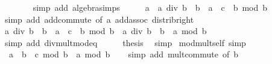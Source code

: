 \begin{isabellebody}
\ \ \ \ \ \ \isamarkupfalse%
\ {\isacharparenleft}{\kern0pt}simp\ add{\isacharcolon}{\kern0pt}\ algebra{\isacharunderscore}{\kern0pt}simps{\isacharparenright}{\kern0pt}\isanewline
\ \ \isamarkupfalse%
\ \isamarkupfalse%
\ {\isachardoublequoteopen}a\ {\isacharequal}{\kern0pt}\ a\ div\ b\ {\isacharasterisk}{\kern0pt}\ b\ {\isacharplus}{\kern0pt}\ {\isacharparenleft}{\kern0pt}a\ {\isacharplus}{\kern0pt}\ c\ {\isacharasterisk}{\kern0pt}\ b{\isacharparenright}{\kern0pt}\ mod\ b{\isachardoublequoteclose}\isanewline
\ \ \ \ \isamarkupfalse%
\ {\isacharparenleft}{\kern0pt}simp\ add{\isacharcolon}{\kern0pt}\ add{\isachardot}{\kern0pt}commute\ {\isacharbrackleft}{\kern0pt}of\ a{\isacharbrackright}{\kern0pt}\ add{\isachardot}{\kern0pt}assoc\ distrib{\isacharunderscore}{\kern0pt}right{\isacharparenright}{\kern0pt}\isanewline
\ \ \isamarkupfalse%
\ \isamarkupfalse%
\ {\isachardoublequoteopen}a\ div\ b\ {\isacharasterisk}{\kern0pt}\ b\ {\isacharplus}{\kern0pt}\ {\isacharparenleft}{\kern0pt}a\ {\isacharplus}{\kern0pt}\ c\ {\isacharasterisk}{\kern0pt}\ b{\isacharparenright}{\kern0pt}\ mod\ b\ {\isacharequal}{\kern0pt}\ a\ div\ b\ {\isacharasterisk}{\kern0pt}\ b\ {\isacharplus}{\kern0pt}\ a\ mod\ b{\isachardoublequoteclose}\isanewline
\ \ \ \ \isamarkupfalse%
\ {\isacharparenleft}{\kern0pt}simp\ add{\isacharcolon}{\kern0pt}\ div{\isacharunderscore}{\kern0pt}mult{\isacharunderscore}{\kern0pt}mod{\isacharunderscore}{\kern0pt}eq{\isacharparenright}{\kern0pt}\isanewline
\ \ \isamarkupfalse%
\ \isamarkupfalse%
\ {\isacharquery}{\kern0pt}thesis\ \isamarkupfalse%
\ simp\isanewline
{}\isamarkupfalse%
%
\endisatagproof
{\isafoldproof}%
%
\isadelimproof
\isanewline
%
\endisadelimproof
\isanewline
{}\isamarkupfalse%
\ mod{\isacharunderscore}{\kern0pt}mult{\isacharunderscore}{\kern0pt}self{}\ {\isacharbrackleft}{\kern0pt}simp{\isacharbrackright}{\kern0pt}{\isacharcolon}{\kern0pt}\isanewline
\ \ {\isachardoublequoteopen}{\isacharparenleft}{\kern0pt}a\ {\isacharplus}{\kern0pt}\ b\ {\isacharasterisk}{\kern0pt}\ c{\isacharparenright}{\kern0pt}\ mod\ b\ {\isacharequal}{\kern0pt}\ a\ mod\ b{\isachardoublequoteclose}\isanewline
%
\isadelimproof
\ \ %
\endisadelimproof
%
\isatagproof
{}\isamarkupfalse%
\ {\isacharparenleft}{\kern0pt}simp\ add{\isacharcolon}{\kern0pt}\ mult{\isachardot}{\kern0pt}commute\ {\isacharbrackleft}{\kern0pt}of\ b{\isacharbrackright}{\kern0pt}{\isacharparenright}{\kern0pt}%

\end{isabellebody}

